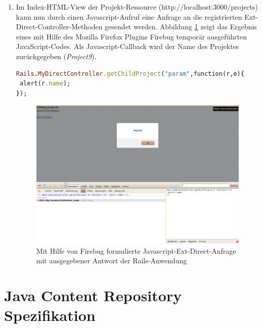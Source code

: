\begin{enumerate}
\begin{lstlisting}[language=ruby,frame=single,title=\emph{app/controllers/projects\_controller.rb}, numbers=none]
  # activate extr for this controller
  include Extr::DirectController


  #disable Rails 3 authenticity_token for demonstration, not recom. in production
  skip_before_filter :verify_authenticity_token


  #register 2 ext direct controller action with different, optional controller name (MyDirectController)
  direct "MyDirectController",
    :getChildProject => 1,
    :someOtherMethod => 2


  def getChildProject
    # render a random project name as json response
    render :json => {:name => "Project#{Random.rand(11)}"}.to_json
  end

\end{lstlisting}

\item
Im Index-HTML-View der Projekt-Ressource (http://localhost:3000/projects) kann nun durch einen Javascript-Aufruf eine Anfrage an die registrierten Ext-Direct-Controller-Methoden gesendet werden. Abbildung \ref{extrreqeust} zeigt das Ergebnis eines mit Hilfe des Mozilla Firefox Plugins Firebug temporär ausgeführten JavaScript-Codes.
Als Javascript-Callback wird der Name des Projektes zurückgegeben (\emph{Project9}).
\begin{lstlisting}[language=ruby,frame=single,title=\emph{Javascript zum Aufruf des Projekt-Controllers in der Rails-Anwendung}]
Rails.MyDirectController.getChildProject("param",function(r,e){
 alert(r.name);
});

\end{lstlisting}

\begin{figure}[!h]
\begin{center}
\includegraphics[scale=0.3]{images/anhang/extrbrowserrequest.png}
\caption{Mit Hilfe von Firebug formulierte Javascript-Ext-Direct-Anfrage mit ausgegebener Antwort der Rails-Anwendung}
\label{extrreqeust}
\end{center}
\end{figure}
\end{enumerate}

\section{Java Content Repository Spezifikation}
%

